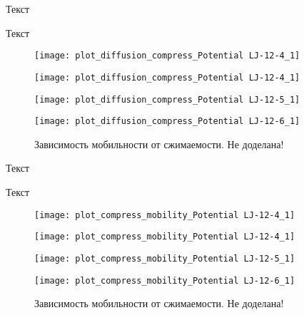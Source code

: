 Текст

Текст

\begin{figure}[htbp!]
\begin{center}
\begin{minipage}[h]{0.45\linewidth}
\texttt{[image: plot\_diffusion\_compress\_Potential LJ-12-4\_1]}
\end{minipage}
\begin{minipage}[h]{0.45\linewidth}
\texttt{[image: plot\_diffusion\_compress\_Potential LJ-12-4\_1]}
\end{minipage}


\begin{minipage}[h]{0.45\linewidth}
\texttt{[image: plot\_diffusion\_compress\_Potential LJ-12-5\_1]}
\end{minipage}
\begin{minipage}[h]{0.45\linewidth}
\texttt{[image: plot\_diffusion\_compress\_Potential LJ-12-6\_1]}
\end{minipage}
\caption{Зависимость мобильности от сжимаемости. Не доделана!}
\label{ris21}
\end{center}
\end{figure}

Текст

Текст

\begin{figure}[htbp!]
\begin{center}
\begin{minipage}[h]{0.45\linewidth}
\texttt{[image: plot\_compress\_mobility\_Potential LJ-12-4\_1]}
\end{minipage}
\begin{minipage}[h]{0.45\linewidth}
\texttt{[image: plot\_compress\_mobility\_Potential LJ-12-4\_1]}
\end{minipage}


\begin{minipage}[h]{0.45\linewidth}
\texttt{[image: plot\_compress\_mobility\_Potential LJ-12-5\_1]}
\end{minipage}
\begin{minipage}[h]{0.45\linewidth}
\texttt{[image: plot\_compress\_mobility\_Potential LJ-12-6\_1]}
\end{minipage}
\caption{Зависимость мобильности от сжимаемости. Не доделана!}
\label{ris22}
\end{center}
\end{figure}

